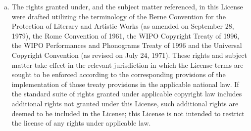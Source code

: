\documentclass[12pt,letterpaper,oneside,final]{memoir}
\begin{document}
\begin{appendices}
\begin{enumerate}[1.]
\begin{enumerate}[a.]
   \item The rights granted under, and the subject matter referenced, in this License were drafted utilizing the terminology of the Berne Convention for the Protection of Literary and Artistic Works (as amended on September 28, 1979), the Rome Convention of 1961, the WIPO Copyright Treaty of 1996, the WIPO Performances and Phonograms Treaty of 1996 and the Universal Copyright Convention (as revised on July 24, 1971). These rights and subject matter take effect in the relevant jurisdiction in which the License terms are sought to be enforced according to the corresponding provisions of the implementation of those treaty provisions in the applicable national law. If the standard suite of rights granted under applicable copyright law includes additional rights not granted under this License, such additional rights are deemed to be included in the License; this License is not intended to restrict the license of any rights under applicable law.
   \end{enumerate}
\end{enumerate}


\end{appendices}

\newpage

\clearpage

\backmatter

\begin{OnehalfSpace}
\setlength{\bibitemsep}{\onelineskip}
\printbibliography

\end{OnehalfSpace}
\end{document}
